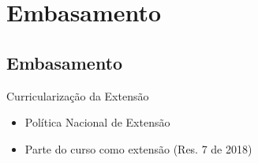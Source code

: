 \section{Embasamento}
\subsection*{Embasamento}

\begin{frame}{{\sffamily Curricularização da Extensão}}
\begin{block}{}
    \begin{itemize}
        \item Política Nacional de Extensão
        \item Parte do curso como extensão (Res. 7 de 2018)
    \end{itemize}   


\end{block}
\end{frame}

